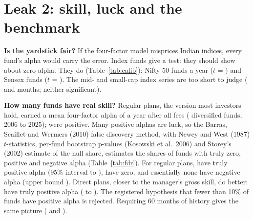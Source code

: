\documentclass[11pt]{article}
\begin{document}
\begin{table}[htbp]\centering
\caption{The twin gap by category, \% a year.}\label{tab:commcat}
{\small}
\end{table}

\begin{table}[htbp]\centering
\caption{Event tests: within-pair change in the annualised gap, 12 months after minus 12 months before.}\label{tab:events}
{\small}
\end{table}

\section{Leak 2: skill, luck and the benchmark}\label{sec:skill}
\textbf{Is the yardstick fair?} If the four-factor model misprices Indian indices, every fund's alpha would carry the error. Index funds give a test: they should show about zero alpha. They do (Table~\ref{tab:calib}): Nifty 50 funds \CalibNiftyFiveZeroAlpha{} a year ($t$ = \CalibNiftyFiveZeroT) and Sensex funds \CalibSensexAlpha{} ($t$ = \CalibSensexT). The mid- and small-cap index series are too short to judge (\CalibMidcapOneFiveZeroMonths{} and \CalibSmallcapTwoFiveZeroMonths{} months; neither significant).

\textbf{How many funds have real skill?} Regular plans, the version most investors hold, earned a mean four-factor alpha of \SkillRegMeanAlpha{} a year after all fees (\SkillRegFunds{} diversified funds, 2006 to 2025); \SkillRegSharePosAlpha{} were positive. Many positive alphas are luck, so the Barras, Scaillet and Wermers (2010) false discovery method, with Newey and West (1987) $t$-statistics, per-fund bootstrap p-values (Kosowski et al.\ 2006) and Storey's (2002) estimate of the null share, estimates the shares of funds with truly zero, positive and negative alpha (Table~\ref{tab:fdr}). For regular plans, \SkillRegPiPlus{} have truly positive alpha (95\% interval \SkillRegPiPlusLo{} to \SkillRegPiPlusHi), \SkillRegPiZero{} have zero, and essentially none have negative alpha (upper bound \SkillRegPiMinusHi). Direct plans, closer to the manager's gross skill, do better: \SkillDirPiPlus{} have truly positive alpha (\SkillDirPiPlusLo{} to \SkillDirPiPlusHi). The registered hypothesis that fewer than 10\% of funds have positive alpha is rejected. Requiring 60 months of history gives the same picture (\SkillRegMinSixZeroPiPlus{} and \SkillDirMinSixZeroPiPlus).
\end{document}
